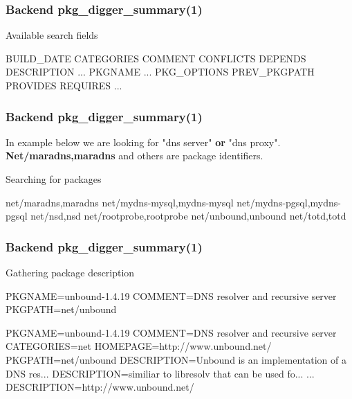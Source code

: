 \documentclass[hyperref=unicode,ascii,xcolor=dvipsnames]{beamer}
\begin{document}
\begin{frame}[fragile]
  \frametitle{Backend pkg\_digger\_summary(1)}
  \begin{block}{Available search fields}
    \begin{Code}{}
BUILD\_DATE
CATEGORIES
COMMENT
CONFLICTS
DEPENDS
DESCRIPTION
...
PKGNAME
...
PKG\_OPTIONS
PREV\_PKGPATH
PROVIDES
REQUIRES
...
\prompt{#}
    \end{Code}
  \end{block}
\end{frame}


\begin{frame}[fragile]
  \frametitle{Backend pkg\_digger\_summary(1)}
  In example below we are looking for "dns server" {\bf or} "dns proxy".
  {\bf Net/maradns,maradns} and others are package identifiers.
  \begin{block}{Searching for packages}
    \begin{Code}{}
net/maradns,maradns
net/mydns-mysql,mydns-mysql
net/mydns-pgsql,mydns-pgsql
net/nsd,nsd
net/rootprobe,rootprobe
net/unbound,unbound
net/totd,totd
\prompt{# }
    \end{Code}
  \end{block}
\end{frame}


\begin{frame}[fragile]
  \frametitle{Backend pkg\_digger\_summary(1)}
  \begin{block}{Gathering package description}
    \begin{Code}{}
PKGNAME=unbound-1.4.19
COMMENT=DNS resolver and recursive server
PKGPATH=net/unbound

PKGNAME=unbound-1.4.19
COMMENT=DNS resolver and recursive server
CATEGORIES=net
HOMEPAGE=http://www.unbound.net/
PKGPATH=net/unbound
DESCRIPTION=Unbound is an implementation of a DNS res...
DESCRIPTION=similiar to libresolv that can be used fo...
...
DESCRIPTION=http://www.unbound.net/

\prompt{#}
    \end{Code}
  \end{block}
\end{frame}
\end{document}
